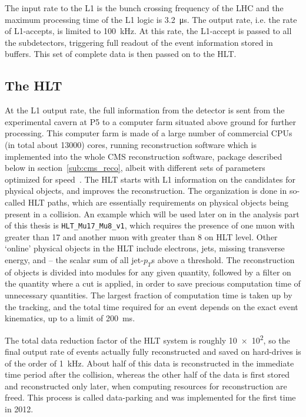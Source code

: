 The input rate to the L1 is the bunch crossing frequency of the LHC and the maximum processing time of the L1 logic is \SI{3.2}{\micro\second}. The output rate, 
i.e. the rate of L1-accepts, is limited to \SI{100}{\kilo\hertz}. At this rate, the
L1-accept is passed to all the subdetectors, triggering full readout of the event information stored in buffers. This set of complete data is then passed on to the HLT.

\subsection{The HLT}
\label{sub:hlt}
At the L1 output rate, the full information from the detector is sent from the experimental cavern at P5 to a computer farm situated above ground for further processing.
This computer farm is made of a large number of commercial CPUs (in total about \num{13000}) cores, running reconstruction software which is implemented into the whole 
CMS reconstruction software, package 
described below in section~\ref{sub:cms_reco}, albeit with different sets of parameters optimized for speed~\cite{hltcms, hltcms2}. The HLT starts with L1 information on the candidates for
physical objects, and improves the reconstruction. The organization is done in so-called HLT paths, which are essentially requirements on physical objects being present in
a collision. An example which will be used later on in the analysis part of this thesis is \texttt{HLT\_Mu17\_Mu8\_v1}, which requires the presence of one muon with \pt
greater than 17 \gev and another muon with \pt greater than 8 \gev on HLT level. Other `online' physical objects in the HLT include electrons, jets, missing transverse
energy, and \HT -- the scalar sum of all jet-$p_T$s above a threshold. The reconstruction of objects is divided into modules for any given quantity, followed by a filter on 
the quantity where a cut is applied, in order to save precious computation time of unnecessary quantities. The largest fraction of computation time is taken up by the tracking, and
the total time required for an event depends on the exact event kinematics, up to a limit of \SI{200}{\milli\second}.

The total data reduction factor of the HLT system is roughly \num{10e2}, so the final output rate of events actually fully reconstructed and saved on hard-drives is of the order
of \SI{1}{\kilo\hertz}. About half of this data is reconstructed in the immediate time period after the collision, whereas the other half of the data is first stored and 
reconstructed only later, when computing resources for reconstruction are freed. This process is called data-parking and was implemented for the first time in 2012.

